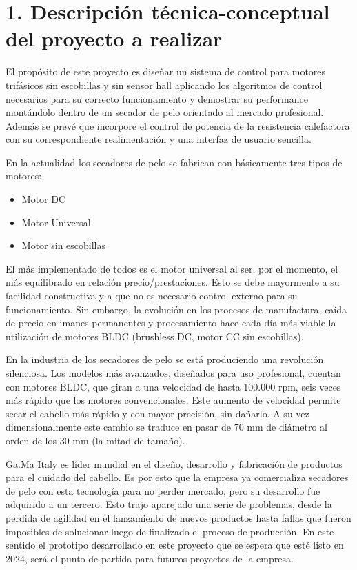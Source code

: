 \documentclass[
11pt, %
codirector, %
]{charter}
\begin{document}
\section{1. Descripción técnica-conceptual del proyecto a realizar}
\label{sec:descripcion}

El propósito de este proyecto es diseñar un sistema de control para motores trifásicos sin escobillas y sin sensor hall aplicando los algoritmos de control necesarios para su correcto funcionamiento y demostrar su performance montándolo dentro de un secador de pelo orientado al mercado profesional. Además se prevé que incorpore el control de potencia de la resistencia calefactora con su correspondiente realimentación y una interfaz de usuario sencilla.

En la actualidad los secadores de pelo se fabrican con básicamente tres tipos de motores:
\begin{itemize}
	\item Motor DC
	\item Motor Universal
	\item Motor sin escobillas
\end{itemize}
El más implementado de todos es el motor universal al ser, por el momento, el más equilibrado en relación precio/prestaciones. Esto se debe mayormente a su facilidad constructiva y a que no es necesario control externo para su funcionamiento.
Sin embargo, la evolución en los procesos de manufactura, caída de precio en imanes permanentes y procesamiento hace cada día más viable la utilización de motores BLDC (brushless DC, motor CC sin escobillas).

En la industria de los secadores de pelo se está produciendo una revolución silenciosa. Los modelos más avanzados, diseñados para uso profesional, cuentan con motores BLDC, que giran a una velocidad de hasta 100.000 rpm, seis veces más rápido que los motores convencionales. Este aumento de velocidad permite secar el cabello más rápido y con mayor precisión, sin dañarlo. A su vez dimensionalmente este cambio se traduce en pasar de 70 mm de diámetro al orden de los 30 mm (la mitad de tamaño).

Ga.Ma Italy es líder mundial en el diseño, desarrollo y fabricación de productos para el cuidado del cabello. Es por esto que la empresa ya comercializa secadores de pelo con esta tecnología para no perder mercado, pero su desarrollo fue adquirido a un tercero. Esto trajo aparejado una serie de problemas, desde la perdida de agilidad en el lanzamiento de nuevos productos hasta fallas que fueron imposibles de solucionar luego de finalizado el proceso de producción. En este sentido el prototipo desarrollado en este proyecto que se espera que esté listo en 2024, será el punto de partida para futuros proyectos de la empresa.
\end{document}
